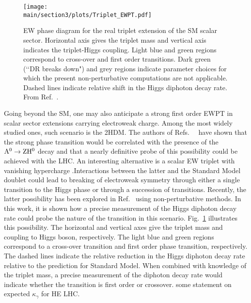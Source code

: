 \begin{figure}[hbtp]
  \begin{center}
  \texttt{[image: \\main/section3/plots/Triplet\_EWPT.pdf]}
    \caption{
    EW phase diagram for the real triplet extension of the SM scalar sector. Horizontal axis gives the triplet mass and vertical axis indicates the triplet-Higgs coupling. Light blue and green regions correspond to cross-over and first order transitions. Dark green (\lq\lq DR breaks down") and grey regions indicate parameter choices for which the present non-perturbative computations are not applicable. Dashed lines indicate relative shift in the Higgs diphoton decay rate. From Ref.~\cite{Niemi:2018asa}.    
        }
    \label{fig:ewpt_triplet}
  \end{center}
\end{figure}

Going beyond the SM, one may also anticipate a strong first order EWPT in scalar sector extensions carrying electroweak charge. Among the most widely studied ones, such scenario is the 2HDM. The authors of Refs.~~\cite{Dorsch:2013wja,Dorsch:2014qja} have shown that the strong phase transition would be correlated with the presence of the\linebreak $\rm A^0\to Z H^0$ decay and that a nearly definitive probe of this possibility could be achieved with the LHC. An interesting alternative is a scalar EW triplet with vanishing hypercharge .Interactions between the latter and the Standard Model doublet could lead to breaking of electroweak symmetry through either a single transition to the Higgs phase or through a succession of transitions\cite{Patel:2012pi}. Recently, the latter possibility has been explored in Ref.~\cite{Niemi:2018asa} using non-perturbative methods. In this work, it is shown how a precise measurement of the Higgs diphoton decay rate could probe the nature of the transition in this scenario. Fig.~\ref{fig:ewpt_triplet} illustrates this possibility. The horizontal and vertical axes give the triplet mass and coupling to Higgs boson, respectively. The light blue and green regions correspond to a cross-over transition and first order phase transition, respectively. The dashed lines indicate the relative reduction in the Higgs diphoton decay rate relative to the prediction for Standard Model. When combined with knowledge of the triplet mass, a precise measurement of the diphoton decay rate would indicate whether the transition is first order or crossover. {\color{magenta} some statement on expected $\kappa_\gamma$ for HE LHC}.



